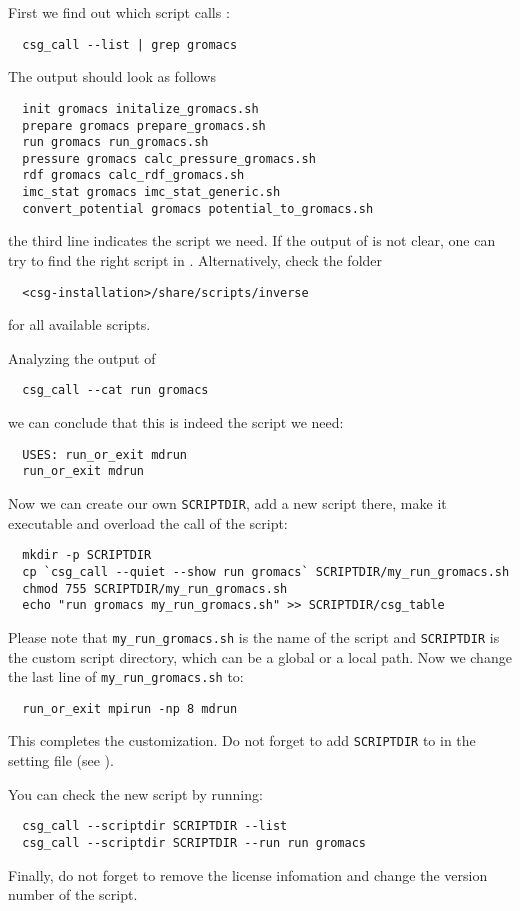 First we find out which script calls :
\begin{verbatim}
  csg_call --list | grep gromacs
\end{verbatim}
The output should look as follows
\begin{verbatim}
  init gromacs initalize_gromacs.sh
  prepare gromacs prepare_gromacs.sh
  run gromacs run_gromacs.sh
  pressure gromacs calc_pressure_gromacs.sh
  rdf gromacs calc_rdf_gromacs.sh
  imc_stat gromacs imc_stat_generic.sh
  convert_potential gromacs potential_to_gromacs.sh
\end{verbatim}
the third line indicates the script we need. If the output of  is not clear, one can try to find the right script in . Alternatively, check the folder
\begin{verbatim}
  <csg-installation>/share/scripts/inverse
\end{verbatim}
for all available scripts. 

Analyzing the output of
\begin{verbatim}
  csg_call --cat run gromacs
\end{verbatim}
we can conclude that this is indeed the script we need:
%
\begin{verbatim}
  USES: run_or_exit mdrun
  run_or_exit mdrun
\end{verbatim}
Now we can create our own \texttt{SCRIPTDIR}, add a new script there, make it executable and overload the call of the script:
\begin{verbatim}
  mkdir -p SCRIPTDIR
  cp `csg_call --quiet --show run gromacs` SCRIPTDIR/my_run_gromacs.sh
  chmod 755 SCRIPTDIR/my_run_gromacs.sh
  echo "run gromacs my_run_gromacs.sh" >> SCRIPTDIR/csg_table
\end{verbatim}
Please note that \texttt{my\_run\_gromacs.sh} is the name of the script and \texttt{SCRIPTDIR} is the custom script directory, which can be a global or a local path.
Now we change the last line of \texttt{my\_run\_gromacs.sh} to:
\begin{verbatim}
  run_or_exit mpirun -np 8 mdrun
\end{verbatim}
This completes the customization. Do not forget to add \texttt{SCRIPTDIR} to  in the setting \xml file (see ).

You can check the new script by running:
\begin{verbatim}
  csg_call --scriptdir SCRIPTDIR --list
  csg_call --scriptdir SCRIPTDIR --run run gromacs
\end{verbatim}

Finally, do not forget to remove the license infomation and change the version number of the script.

